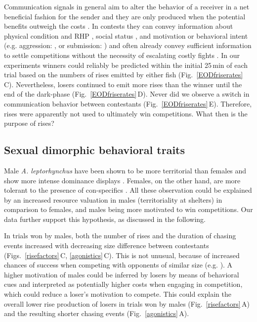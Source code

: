 \documentclass[vruler,JEB]{COB}%
\newcommand{\lepto}{\textit{A. leptorhynchus}}
\newcommand{\panel}[1]{\textsf{#1}}
\newcommand{\subfref}[2]{\textup{\ref{#1}}\,\panel{#2}}
\newcommand{\Fig}{Fig.}
\newcommand{\Subfigref}[2]{\Fig~\subfref{#1}{#2}}
\newcommand{\Figb}{Fig.}
\newcommand{\Figsb}{Figs.}
\newcommand{\Subfigrefb}[2]{\Figb~\subfref{#1}{#2}}
\newcommand{\Subfigsrefb}[2]{\Figsb~\subfref{#1}{#2}}
\begin{document}
Communication signals in general aim to alter the behavior of a receiver in a net beneficial fashion for the sender and they are only produced when the potential benefits outweigh the costs \citep{Endler1993, Seyfarth2010}. In contests they can convey information about physical condition and RHP \citep{Davies1978, Cluttonbrock1979}, social status \citep{Huyghe2005, Fernald2014}, and motivation or behavioral intent (e.g. aggression: \citealp{Triefenbach2008, Kareklas2019}, or submission: \citealp{Hupe2008, Silva2012}) and often already convey sufficient information to settle competitions without the necessity of escalating costly fights \citep{ArnottElwood2009}. In our experiments winners could reliably be predicted within the initial 25\,min of each trial based on the numbers of rises emitted by either fish (\Subfigrefb{EODfriserates}{C}). Nevertheless, losers continued to emit more rises than the winner until the end of the dark-phase (\Subfigrefb{EODfriserates}{D}). Never did we observe a switch in communication behavior between contestants (\Subfigrefb{EODfriserates}{E}). Therefore, rises were apparently not used to ultimately win competitions. What then is the purpose of rises?

\subsection{Sexual dimorphic behavioral traits}

Male \lepto{} have been shown to be more territorial than females \citep{Dunlap2002} and show more intense dominance displays \citep{Raab2019}. Females, on the other hand, are more tolerant to the presence of con-specifics \citep{ZupancMaler1993,Cuddy2012}. All these observation could be explained by an increased resource valuation in males (territoriality at shelters) in comparison to females, and males being more motivated to win competitions. Our data further support this hypothesis, as discussed in the following.

In trials won by males, both the number of rises and the duration of chasing events increased with decreasing size difference between contestants (\Subfigsrefb{risefactors}{C}, \subfref{agonistics}{C}). This is not unusual, because of increased chances of success when competing with opponents of similar size (e.g. \citealp{Cluttonbrock1979, Enquist1990}). A higher motivation of males could be inferred by losers by means of behavioral cues and interpreted as potentially higher costs when engaging in competition, which could reduce a loser's motivation to compete. This could explain the overall lower rise production of losers in trials won by males (\Subfigref{risefactors}{A}) and the resulting shorter chasing events (\Subfigref{agonistics}{A}). 
\end{document}
